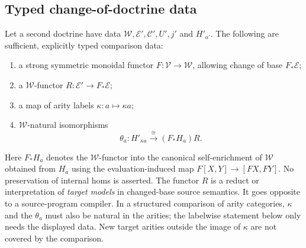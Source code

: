 \documentclass[11pt]{article}
\theoremstyle{definition}
\theoremstyle{remark}
\newcommand{\V}{\mathcal V}
\newcommand{\W}{\mathcal W}
\newcommand{\E}{\mathcal E}
\newcommand{\C}{\mathcal C}
\begin{document}
\subsection{Typed change-of-doctrine data}
Let a second doctrine have data $\W,\E',\C',U',j'$ and $H'_{a'}$.
The following are sufficient, explicitly typed comparison data:
\begin{enumerate}[label=(\roman*)]
\item a strong symmetric monoidal functor $F:\V\to\W$, allowing change of base
      $F_*\E$;
\item a $\W$-functor $R:\E'\to F_*\E$;
\item a map of arity labels $\kappa:a\mapsto\kappa a$;
\item $\W$-natural isomorphisms
\begin{equation}\label{cat-eq:theta}
 \theta_a:H'_{\kappa a}\xrightarrow{\ \cong\ }
       (F_*H_a)R.
\end{equation}
\end{enumerate}
Here $F_*H_a$ denotes the $\W$-functor into the canonical
self-enrichment of $\W$ obtained from $H_a$ using the evaluation-induced
map $F[X,Y]\to[FX,FY]$. No preservation of internal homs is asserted.
The functor $R$ is a reduct or interpretation of \emph{target models}
in changed-base source semantics. It goes opposite to a source-program
compiler. In a structured comparison of arity categories, $\kappa$ and
the $\theta_a$ must also be natural in the arities; the labelwise statement
below only needs the displayed data. New target arities outside the image
of $\kappa$ are not covered by the comparison.
\end{document}
